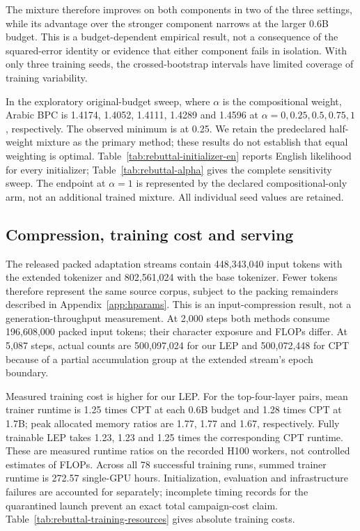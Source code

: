 \documentclass{ieeeaccess}
\begin{document}
The mixture therefore improves on both components in two of the three
settings, while its advantage over the stronger component narrows at the
larger 0.6B budget. This is a budget-dependent empirical result, not a
consequence of the squared-error identity or evidence that either
component fails in isolation. With only three training seeds, the
crossed-bootstrap intervals have limited coverage of training variability.

In the exploratory original-budget sweep, where $\alpha$ is the
compositional weight, Arabic BPC is 1.4174, 1.4052, 1.4111, 1.4289 and
1.4596 at $\alpha=0,0.25,0.5,0.75,1$, respectively. The observed minimum
is at 0.25. We retain the predeclared half-weight mixture as the primary
method; these results do not establish that equal weighting is optimal.
Table~\ref{tab:rebuttal-initializer-en} reports English likelihood for every
initializer; Table~\ref{tab:rebuttal-alpha} gives the complete sensitivity
sweep. The endpoint at $\alpha=1$ is represented by the declared
compositional-only arm, not an additional trained mixture. All individual
seed values are retained.






\subsection{Compression, training cost and serving}
\label{sec:res_eff}

The released packed adaptation streams contain 448{,}343{,}040 input
tokens with the extended tokenizer and 802{,}561{,}024 with the base
tokenizer. Fewer tokens therefore represent the same source corpus,
subject to the packing remainders described in Appendix~\ref{app:hparams}.
This is an input-compression result, not a generation-throughput measurement.
At 2{,}000 steps both methods consume 196{,}608{,}000 packed input tokens;
their character exposure and FLOPs differ. At 5{,}087 steps, actual counts
are 500{,}097{,}024 for our LEP and 500{,}072{,}448 for CPT because of a partial
accumulation group at the extended stream's epoch boundary.

Measured training cost is higher for our LEP. For the top-four-layer pairs,
mean trainer runtime is 1.25 times CPT at each 0.6B budget and 1.28 times
CPT at 1.7B; peak allocated memory ratios are 1.77, 1.77 and 1.67,
respectively. Fully trainable LEP takes 1.23, 1.23 and 1.25 times the
corresponding CPT runtime. These are measured runtime ratios on the
recorded H100 workers, not controlled estimates of FLOPs.
Across all 78 successful training runs, summed trainer runtime is
272.57 single-GPU hours. Initialization, evaluation and infrastructure
failures are accounted for separately; incomplete timing records for the
quarantined launch prevent an exact total campaign-cost claim.
Table~\ref{tab:rebuttal-training-resources} gives absolute training costs.
\end{document}
